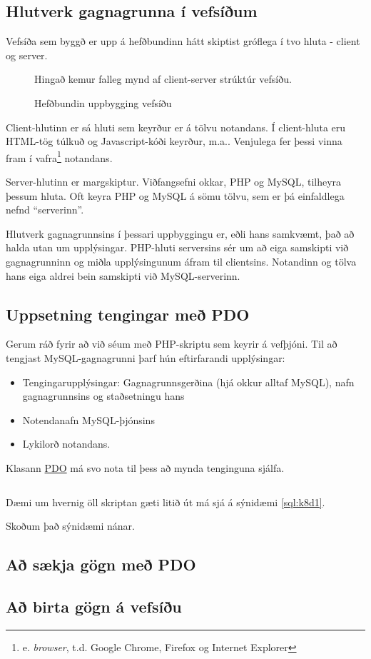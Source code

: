\subsection{Hlutverk gagnagrunna í vefsíðum}
Vefsíða sem byggð er upp á hefðbundinn hátt skiptist gróflega í tvo hluta - client og server. 

\begin{figure}
\centering
\caption{Hefðbundin uppbygging vefsíðu}
\label{mynd:uppbyggingvefsidu}
\color{red} Hingað kemur falleg mynd af client-server strúktúr vefsíðu.
\end{figure}

Client-hlutinn er sá hluti sem keyrður er á tölvu notandans. Í client-hluta eru HTML-tög túlkuð og Javascript-kóði keyrður, m.a.. Venjulega fer þessi vinna fram í vafra\footnote{e. \emph{browser}, t.d. Google Chrome, Firefox og Internet Explorer} notandans.

Server-hlutinn er margskiptur. Viðfangsefni okkar, PHP og MySQL, tilheyra þessum hluta. Oft keyra PHP og MySQL á sömu tölvu, sem er þá einfaldlega nefnd ``serverinn''.

Hlutverk gagnagrunnsins í þessari uppbyggingu er, eðli hans samkvæmt, það að halda utan um upplýsingar. PHP-hluti serversins sér um að eiga samskipti við gagnagrunninn og miðla upplýsingunum áfram til clientsins. Notandinn og tölva hans eiga aldrei bein samskipti við MySQL-serverinn.

\subsection{Uppsetning tengingar með PDO}
Gerum ráð fyrir að við séum með PHP-skriptu sem keyrir á vefþjóni. Til að tengjast MySQL-gagnagrunni þarf hún eftirfarandi upplýsingar:
\begin{itemize}
 \item Tengingarupplýsingar: Gagnagrunnsgerðina (hjá okkur alltaf MySQL), nafn gagnagrunnsins og staðsetningu hans
 \item Notendanafn MySQL-þjónsins
 \item Lykilorð notandans.
\end{itemize}
Klasann \href{http://www.php.net/manual/en/class.pdo.php}{PDO} má svo nota til þess að mynda tenginguna sjálfa. 

\begin{example}[h]
\caption{Tenging við gagnagrunn með PDO}
\label{sql:k8d1}
\centering
\inputminted[frame=lines, fontfamily=courier]{php}{sql/k8d1.php}
\end{example}

Dæmi um hvernig öll skriptan gæti litið út má sjá á sýnidæmi \ref{sql:k8d1}.

Skoðum það sýnidæmi nánar.


\subsection{Að sækja gögn með PDO}
\subsection{Að birta gögn á vefsíðu}